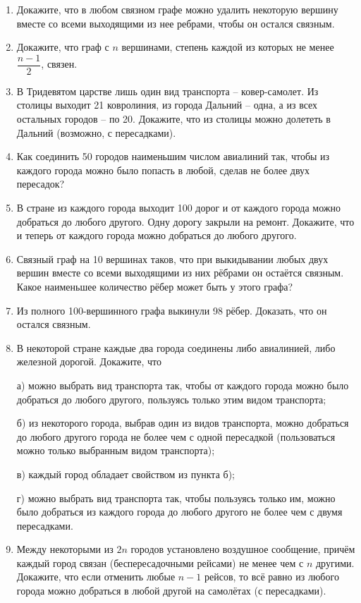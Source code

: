 \documentclass{article}
\begin{document}
\begin{enumerate}[label*=\protect\fbox{\arabic{enumi}}]
\item Докажите, что в любом связном графе можно удалить некоторую вершину вместе со всеми выходящими из нее ребрами, чтобы он остался связным.

\item Докажите, что граф с $n$ вершинами, степень каждой из которых не менее $\dfrac{n - 1}{2}$, связен.

\item В Тридевятом царстве лишь один вид транспорта – ковер-самолет. Из столицы выходит 21 ковролиния, из города Дальний – одна, а из всех остальных городов – по 20. Докажите, что из столицы можно долететь в Дальний (возможно, с пересадками).

\item Как соединить 50 городов наименьшим числом авиалиний так, чтобы из каждого города можно было попасть в любой, сделав не более двух пересадок?

\item В стране из каждого города выходит 100 дорог и от каждого города можно добраться до любого другого. Одну дорогу закрыли на ремонт. Докажите, что и теперь от каждого города можно добраться до любого другого.

\item Связный граф на 10 вершинах таков, что при выкидывании любых двух  вершин вместе со всеми выходящими из них рёбрами он остаётся связным. Какое наименьшее количество рёбер может быть у этого графа?

\item Из полного 100-вершинного графа выкинули 98 рёбер. Доказать, что он остался связным.

\item В некоторой стране каждые два города соединены либо авиалинией, либо железной дорогой. Докажите, что

а) можно выбрать вид транспорта так, чтобы от каждого города можно было добраться до любого другого, пользуясь только этим видом транспорта;

б) из некоторого города, выбрав один из видов транспорта, можно добраться до любого другого города не более чем с одной пересадкой (пользоваться можно только выбранным видом транспорта);

в) каждый город обладает свойством из пункта б);

г) можно выбрать вид транспорта так, чтобы пользуясь только им, можно было добраться из каждого города до любого другого не более чем с двумя пересадками.

\item Между некоторыми из $2n$ городов установлено воздушное сообщение, причём каждый город связан (беспересадочными рейсами) не менее чем с $n$ другими. Докажите, что если отменить любые $n - 1$ рейсов, то всё равно из любого города можно добраться в любой другой на самолётах (с пересадками).


\end{enumerate}
\end{document}
